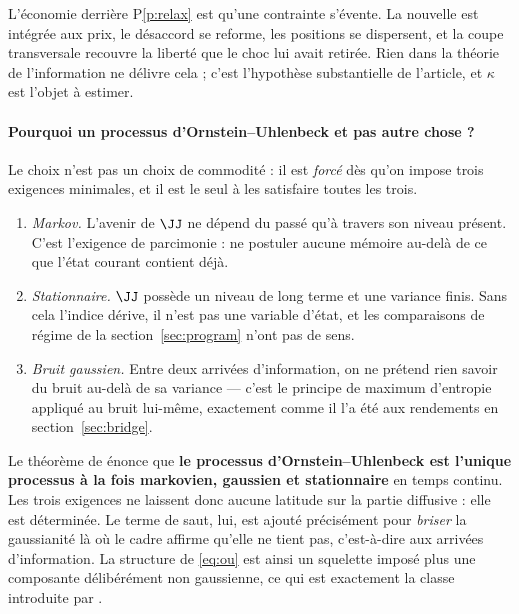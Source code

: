 L'économie derrière P\ref{p:relax} est qu'une contrainte s'évente. La nouvelle
est intégrée aux prix, le désaccord se reforme, les positions se dispersent, et
la coupe transversale recouvre la liberté que le choc lui avait retirée. Rien
dans la théorie de l'information ne délivre cela ; c'est l'hypothèse substantielle
de l'article, et $\kappa$ est l'objet à estimer.

\paragraph{Pourquoi un processus d'Ornstein--Uhlenbeck et pas autre chose ?}
Le choix n'est pas un choix de commodité : il est \emph{forcé} dès qu'on impose
trois exigences minimales, et il est le seul à les satisfaire toutes les trois.

\begin{enumerate}
\item \emph{Markov.} L'avenir de $\JJ$ ne dépend du passé qu'à travers son
niveau présent. C'est l'exigence de parcimonie : ne postuler aucune mémoire
au-delà de ce que l'état courant contient déjà.
\item \emph{Stationnaire.} $\JJ$ possède un niveau de long terme et une variance
finis. Sans cela l'indice dérive, il n'est pas une variable d'état, et les
comparaisons de régime de la section~\ref{sec:program} n'ont pas de sens.
\item \emph{Bruit gaussien.} Entre deux arrivées d'information, on ne prétend
rien savoir du bruit au-delà de sa variance --- c'est le principe de maximum
d'entropie appliqué au bruit lui-même, exactement comme il l'a été aux
rendements en section~\ref{sec:bridge}.
\end{enumerate}

Le théorème de \citet{doob1942} énonce que \textbf{le processus d'Ornstein--Uhlenbeck
est l'unique processus à la fois markovien, gaussien et stationnaire} en temps
continu. Les trois exigences ne laissent donc aucune latitude sur la partie
diffusive : elle est déterminée. Le terme de saut, lui, est ajouté précisément
pour \emph{briser} la gaussianité là où le cadre affirme qu'elle ne tient pas,
c'est-à-dire aux arrivées d'information. La structure de \eqref{eq:ou} est ainsi
un squelette imposé plus une composante délibérément non gaussienne, ce qui est
exactement la classe introduite par \citet{bns2001}.

